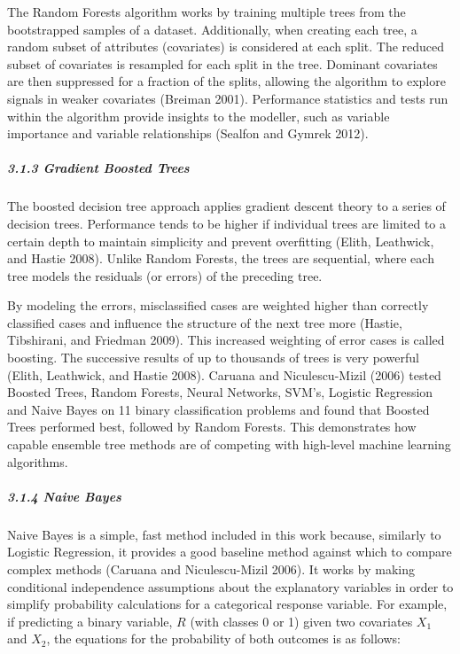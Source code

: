 \documentclass[]{elsarticle} %
\begin{document}
The Random Forests algorithm works by training multiple trees from the
bootstrapped samples of a dataset. Additionally, when creating each
tree, a random subset of attributes (covariates) is considered at each
split. The reduced subset of covariates is resampled for each split in
the tree. Dominant covariates are then suppressed for a fraction of the
splits, allowing the algorithm to explore signals in weaker covariates
(Breiman 2001). Performance statistics and tests run within the
algorithm provide insights to the modeller, such as variable importance
and variable relationships (Sealfon and Gymrek 2012).

\subparagraph{3.1.3 Gradient Boosted
Trees}\label{gradient-boosted-trees}

The boosted decision tree approach applies gradient descent theory to a
series of decision trees. Performance tends to be higher if individual
trees are limited to a certain depth to maintain simplicity and prevent
overfitting (Elith, Leathwick, and Hastie 2008). Unlike Random Forests,
the trees are sequential, where each tree models the residuals (or
errors) of the preceding tree.

By modeling the errors, misclassified cases are weighted higher than
correctly classified cases and influence the structure of the next tree
more (Hastie, Tibshirani, and Friedman 2009). This increased weighting
of error cases is called boosting. The successive results of up to
thousands of trees is very powerful (Elith, Leathwick, and Hastie 2008).
Caruana and Niculescu-Mizil (2006) tested Boosted Trees, Random Forests,
Neural Networks, SVM's, Logistic Regression and Naive Bayes on 11 binary
classification problems and found that Boosted Trees performed best,
followed by Random Forests. This demonstrates how capable ensemble tree
methods are of competing with high-level machine learning algorithms.

\subparagraph{3.1.4 Naive Bayes}\label{naive-bayes}

Naive Bayes is a simple, fast method included in this work because,
similarly to Logistic Regression, it provides a good baseline method
against which to compare complex methods (Caruana and Niculescu-Mizil
2006). It works by making conditional independence assumptions about the
explanatory variables in order to simplify probability calculations for
a categorical response variable. For example, if predicting a binary
variable, \(R\) (with classes 0 or 1) given two covariates \(X_1\) and
\(X_2\), the equations for the probability of both outcomes is as
follows:
\end{document}
